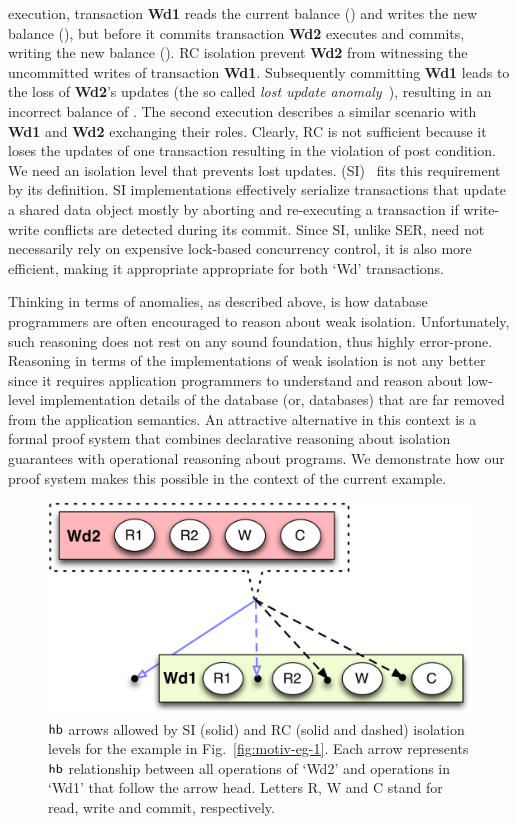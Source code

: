 execution, transaction {\bf Wd1} reads the current balance () and
writes the new balance (), but before it commits transaction
{\bf Wd2} executes and commits, writing the new balance (). RC
isolation prevent {\bf Wd2} from witnessing the uncommitted writes of
transaction {\bf Wd1}.  Subsequently committing {\bf Wd1} leads to the
loss of {\bf Wd2}'s updates (the so called \emph{lost update
anomaly}~\cite{berenson}), resulting in an incorrect balance of
. The second execution describes a similar scenario with {\bf
Wd1} and {\bf Wd2} exchanging their roles.  Clearly, RC is not
sufficient because it loses the updates of one transaction resulting
in the violation of post condition.  We need an isolation level that
prevents lost updates.   (SI)~\cite{berenson}
fits this requirement by its definition. SI implementations
effectively serialize transactions that update a shared data object
mostly by aborting and re-executing a transaction if write-write
conflicts are detected during its commit.  Since SI, unlike SER, need
not necessarily rely on expensive lock-based concurrency control, it
is also more efficient, making it appropriate appropriate for both
`Wd' transactions. 

Thinking in terms of anomalies, as described above, is how database
programmers are often encouraged to reason about weak isolation.
Unfortunately, such reasoning does not rest on any sound foundation,
thus highly error-prone. Reasoning in terms of the implementations of
weak isolation is not any better since it requires application
programmers to understand and reason about low-level implementation
details of the database (or, databases) that are far removed from the
application semantics. An attractive alternative in this context is a
formal proof system that combines declarative reasoning about
isolation guarantees with operational reasoning about programs. We
demonstrate how our proof system makes this possible in the context of
the current example.

\begin{figure}
\centering
  \includegraphics[scale=0.4]{Figures/motiv-eg-1-hb}

\caption{$\textsf{hb}$ arrows allowed by SI (solid) and RC (solid and dashed)
isolation levels for the example in Fig.~\ref{fig:motiv-eg-1}. Each
arrow represents $\textsf{hb}$ relationship between all operations of `Wd2'
and operations in `Wd1' that follow the arrow head. Letters R, W and C
stand for read, write and commit, respectively.}
\label{fig:motiv-eg-1-hb}
\end{figure}

